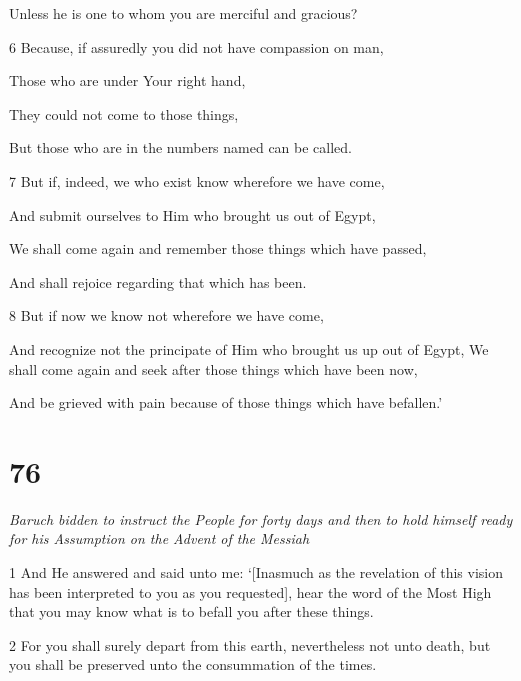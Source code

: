 \par Unless he is one to whom you are merciful and gracious?

\par 6 Because, if assuredly you did not have compassion on man,

\par Those who are under Your right hand,

\par They could not come to those things,

\par But those who are in the numbers named can be called.

\par 7 But if, indeed, we who exist know wherefore we have come,

\par And submit ourselves to Him who brought us out of Egypt,

\par We shall come again and remember those things which have passed,

\par And shall rejoice regarding that which has been.

\par 8 But if now we know not wherefore we have come,

\par And recognize not the principate of Him who brought us up out of Egypt, We shall come again and seek after those things which have been now,

\par And be grieved with pain because of those things which have befallen.’

\chapter{76}

\par \textit{Baruch bidden to instruct the People for forty days and then to hold himself ready for his Assumption on the Advent of the Messiah}

\par 1 And He answered and said unto me: ‘[Inasmuch as the revelation of this vision has been interpreted to you as you requested], hear the word of the Most High that you may know what is to befall you after these things. 

\par 2 For you shall surely depart from this earth, nevertheless not unto death, but you shall be preserved unto the consummation of the times. 

